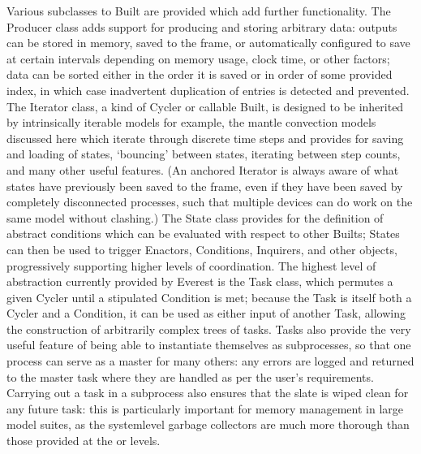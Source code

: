 \documentclass[letterpaper,10pt,english]{jupyterBook}
\begin{document}
\sphinxAtStartPar
Various subclasses to Built are provided which add further functionality. The Producer class adds support for producing and storing arbitrary data: outputs can be stored in memory, saved to the frame, or automatically configured to save at certain intervals depending on memory usage, clock time, or other factors; data can be sorted either in the order it is saved or in order of some provided index, in which case inadvertent duplication of entries is detected and prevented. The Iterator class, a kind of Cycler or callable Built, is designed to be inherited by intrinsically iterable models \sphinxhyphen{} for example, the mantle convection models discussed here which iterate through discrete time steps \sphinxhyphen{} and provides for saving and loading of states, ‘bouncing’ between states, iterating between step counts, and many other useful features. (An anchored Iterator is always aware of what states have previously been saved to the frame, even if they have been saved by completely disconnected processes, such that multiple devices can do work on the same model without clashing.) The State class provides for the definition of abstract conditions which can be evaluated with respect to other Builts; States can then be used to trigger Enactors, Conditions, Inquirers, and other objects, progressively supporting higher levels of coordination. The highest level of abstraction currently provided by Everest is the Task class, which permutes a given Cycler until a stipulated Condition is met; because the Task is itself both a Cycler and a Condition, it can be used as either input of another Task, allowing the construction of arbitrarily complex trees of tasks. Tasks also provide the very useful feature of being able to instantiate themselves as subprocesses, so that one process can serve as a master for many others: any errors are logged and returned to the master task where they are handled as per the user’s requirements. Carrying out a task in a subprocess also ensures that the slate is wiped clean for any future task: this is particularly important for memory management in large model suites, as the system\sphinxhyphen{}level garbage collectors are much more thorough than those provided at the  or  levels.
\end{document}
